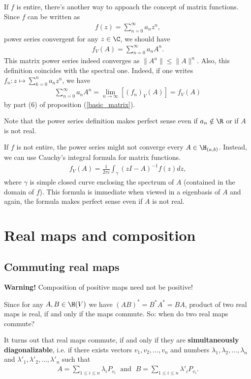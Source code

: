 If $f$ is entire, there's another way to appoach the concept of matrix functions. Since $f$ can be written as
\begin{align*}
	f(z) = \sum_{n = 0}^{\infty} a_{n} z^{n},
\end{align*}
power series convergent for any $z \in \C$, we should have
\begin{align*}
	f_{V}(A) = \sum_{n = 0}^{\infty} a_{n} A^{n}.
\end{align*}
This matrix power series indeed converges as $\|A^{n}\| \leq \|A\|^{n}$. Also, this definition coincides with the spectral one. Indeed, if one writes $f_{n} : z \mapsto  \sum_{k = 0}^{n} a_{n} z^{n}$, we have
\begin{align*}
	\sum_{n = 0}^{\infty}a_{n} A^{n} = \lim_{n \to \infty} \left[(f_{n})_{V}(A) \right] = f_{V}(A)
\end{align*}
by part (6) of proposition (\ref{basic_matrix}).

Note that the power series definition makes perfect sense even if $a_{n} \notin \R$ or if $A$ is not real.

If $f$ is not entire, the power series might not converge every $A \in \H_{(a, b)}$. Instead, we can use Cauchy's integral formula for matrix functions.
\begin{align*}
	f_{V}(A) = \frac{1}{2 \pi i}\int_{\gamma} (z I - A)^{-1} f(z) dz,
\end{align*}
where $\gamma$ is simple closed curve enclosing the spectrum of $A$ (contained in the domain of $f$). This formula is immediate when viewed in a eigenbasis of $A$ and again, the formula makes perfect sense even if $A$ is not real.

\section{Real maps and composition}

\subsection{Commuting real maps}

\textbf{Warning!} Composition of positive maps need not be positive!

Since for any $A, B \in \H(V)$ we have $(A B)^{*} = B^{*} A^{*} = B A$, product of two real maps is real, if and only if the maps commute. So: when do two real maps commute?

It turns out that real maps commute, if and only if they are \textbf{simultaneously diagonalizable}, i.e. if there exists vectors $v_{1}, v_{2}, \ldots, v_{n}$ and numbers $\lambda_{1}, \lambda_{2}, \ldots, \lambda_{n}$ and $\lambda'_{1}, \lambda'_{2}, \ldots, \lambda'_{n}$ such that
\begin{align*}
	A = \sum_{1 \leq i \leq n} \lambda_{i} P_{v_{i}} \; \text{ and } \; B = \sum_{1 \leq i \leq n} \lambda'_{i} P_{v_{i}}.
\end{align*}

